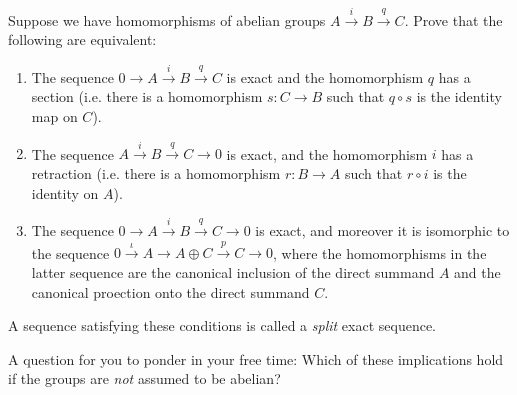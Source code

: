 \begin{problem}
Suppose we have homomorphisms of abelian groups $A \overset{i}{\to} B \overset{q}{\to} C$. Prove that the following are equivalent:
\begin{enumerate}[font=\scshape,label=\textbf{(\Alph*)}, wide]
  \item The sequence $0 \to A \overset{i}{\to} B \overset{q}{\to} C$ is exact and the homomorphism $q$ has a section (i.e. there is a homomorphism $s: C \to B$ such that $q \circ s$ is the identity map on $C$).
  \item The sequence $A \overset{i}{\to} B \overset{q}{\to} C \to 0$ is exact, and the homomorphism $i$ has a retraction (i.e. there is a homomorphism $r : B \to A$ such that $r \circ i$ is the identity on $A$).
  \item The sequence $0 \to A \overset{i}{\to} B \overset{q}{\to} C \to 0$ is exact, and moreover it is isomorphic to the sequence $0 \overset{\iota}{\to} A \to A \oplus C \overset{p}{\to} C \to 0$, where the homomorphisms in the latter sequence are the canonical inclusion of the direct summand $A$ and the canonical proection onto the direct summand $C$.
\end{enumerate}
\begin{remark}
   A sequence satisfying these conditions is called a \emph{split} exact sequence.
\end{remark}
A question for you to ponder in your free time: Which of these implications hold if the groups are \emph{not} assumed to be abelian?
\end{problem}
